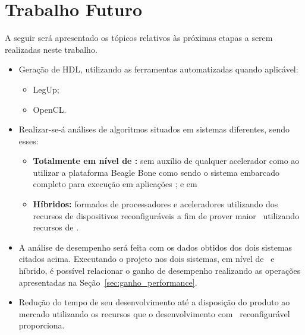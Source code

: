       
   \section{Trabalho Futuro}
      A seguir será apresentado os tópicos relativos às próximas etapas a serem realizadas neste trabalho.
      
      \begin{itemize}
         \item Geração de HDL, utilizando as ferramentas automatizadas quando aplicável:
         \begin{itemize}
            \item LegUp;
            \item OpenCL.
         \end{itemize}
         
      \item Realizar-se-á análises de algoritmos situados em sistemas diferentes, sendo esses:
         \begin{itemize}
            \item \textbf{Totalmente em nível de \software:} sem auxílio de qualquer acelerador como ao utilizar a plataforma Beagle Bone como sendo o sistema embarcado completo para execução em aplicações \wearables; e em
            
            \item \textbf{Híbridos:} formados de processadores e aceleradores utilizando dos recursos de dispositivos reconfiguráveis  a fim de prover maior \speedup\ utilizando recursos de \hardware.
         \end{itemize}
         
         \item A análise de desempenho será feita com os dados obtidos dos dois sistemas citados acima.
         Executando o projeto nos dois sistemas, em nível de \software\ e híbrido, é possível relacionar o ganho de desempenho realizando as operações apresentadas na Seção~\ref{sec:ganho_performance}.
                  
         
      	\item Redução do tempo de seu desenvolvimento até a disposição do produto ao mercado utilizando os recursos que o desenvolvimento com \hardware\ reconfigurável proporciona. %
         \end{itemize}
      